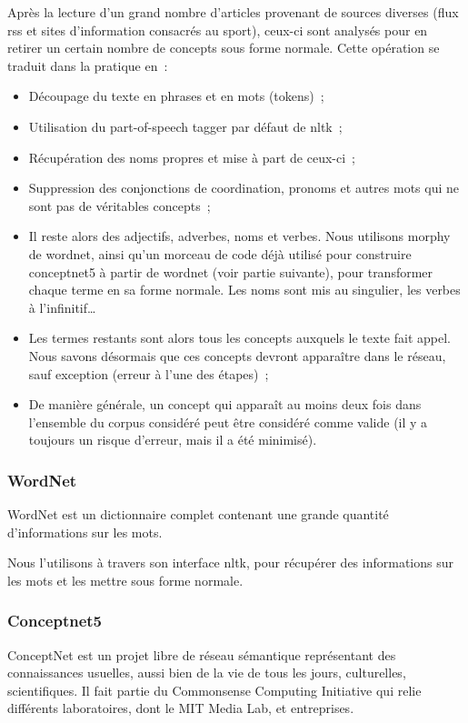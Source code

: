 \documentclass[a4paper,12pt]{article}
\begin{document}
Après la lecture d'un grand nombre d'articles provenant de sources diverses (flux rss et sites d'information consacrés au sport), ceux-ci sont analysés pour en retirer un certain nombre de concepts sous forme normale. Cette opération se traduit dans la pratique en~:
\begin{itemize}
 \item Découpage du texte en phrases et en mots (tokens)~;
 \item Utilisation du part-of-speech tagger par défaut de nltk~;
 \item Récupération des noms propres et mise à part de ceux-ci~;
 \item Suppression des conjonctions de coordination, pronoms et autres mots qui ne sont pas de véritables concepts~;
 \item Il reste alors des adjectifs, adverbes, noms et verbes. Nous utilisons morphy de wordnet, ainsi qu'un morceau de code déjà utilisé pour construire conceptnet5 à partir de wordnet (voir partie suivante), pour transformer chaque terme en sa forme normale. Les noms sont mis au singulier, les verbes à l'infinitif\ldots
 \item Les termes restants sont alors tous les concepts auxquels le texte fait appel. Nous savons désormais que ces concepts devront apparaître dans le réseau, sauf exception (erreur à l'une des étapes)~;
 \item De manière générale, un concept qui apparaît au moins deux fois dans l'ensemble du corpus considéré peut être considéré comme valide (il y a toujours un risque d'erreur, mais il a été minimisé).
\end{itemize}


\subsubsection{WordNet}

WordNet est un dictionnaire complet contenant une grande quantité d'informations sur les mots.

Nous l'utilisons à travers son interface nltk, pour récupérer des informations sur les mots et les mettre sous forme normale.


\subsubsection{Conceptnet5}

ConceptNet est un projet libre de réseau sémantique représentant des connaissances usuelles, aussi bien de la vie de tous les jours, culturelles, scientifiques. Il fait partie du Commonsense Computing Initiative qui relie différents laboratoires, dont le MIT Media Lab, et entreprises.
\end{document}
